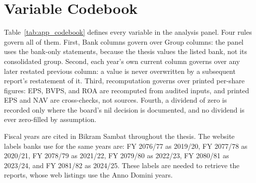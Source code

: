 \section{Variable Codebook}

Table~\ref{tab:app_codebook} defines every variable in the analysis panel. Four rules govern all of them. First, Bank columns govern over Group columns: the panel uses the bank-only statements, because the thesis values the listed bank, not its consolidated group. Second, each year's own current column governs over any later restated previous column: a value is never overwritten by a subsequent report's restatement of it. Third, recomputation governs over printed per-share figures: EPS, BVPS, and ROA are recomputed from audited inputs, and printed EPS and NAV are cross-checks, not sources. Fourth, a dividend of zero is recorded only where the board's nil decision is documented, and no dividend is ever zero-filled by assumption.

Fiscal years are cited in Bikram Sambat throughout the thesis. The website labels banks use for the same years are: FY 2076/77 as 2019/20, FY 2077/78 as 2020/21, FY 2078/79 as 2021/22, FY 2079/80 as 2022/23, FY 2080/81 as 2023/24, and FY 2081/82 as 2024/25. These labels are needed to retrieve the reports, whose web listings use the Anno Domini years.

